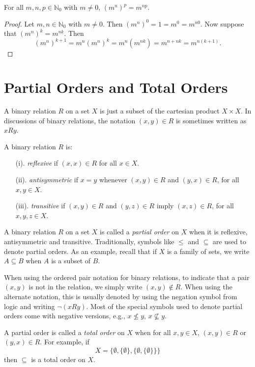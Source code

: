 \begin{theorem}
For all $m,n,p\in\mathbb{N}_0$ with $m\neq0$,
$(m^n)^p=m^{np}$.
\end{theorem}
\begin{proof}
Let $m,n\in\mathbb{N}_0$ with $m\neq0$.  Then
$(m^n)^0=1=m^0=m^{n0}$.  Now suppose that $(m^n)^k=m^{nk}$.
Then 
\[
(m^n)^{k+1}=m^n(m^n)^k=m^n(m^{nk})=m^{n+nk}=m^{n(k+1)}.
\]
\end{proof}

\section{Partial Orders and Total Orders}\label{s:order}

A binary relation $R$ on a set $X$ is just a subset of
the cartesian product $X\times X$.  In discussions of
binary relations, the notation $(x,y)\in R$ is sometimes
written as $xRy$.

A binary relation $R$ is:

\begin{enumerate} 
\item[(i).] \textit{reflexive} if $(x,x)\in R$ for
all $x\in X$.
\item[(ii).] \textit{antisymmetric} if $x=y$ whenever $(x,y)\in R$ and $(y,x)\in R$, for all $x,y\in X$.
\item[(iii).] \textit{transitive} if $(x,y)\in R$ and $(y,z)\in R$
imply $(x,z)\in R$, for all $x,y,z\in X$.
\end{enumerate}

A binary relation $R$ on a set $X$ is called a \textit{partial order} on
$X$ when it is reflexive, antisymmetric and transitive.
Traditionally, symbols like $\le$ and $\subseteq$ are used to denote
partial orders.  As an example, recall that if $X$ is a family of sets, 
we write $A\subseteq B$ when $A$ is a subset of $B$.  

When using the ordered pair notation for binary relations,
to indicate that a pair $(x,y)$ is not in the relation,
we simply write $(x,y)\notin R$. When using the alternate
notation, this is usually denoted by using the negation
symbol from logic and writing $\lnot (xRy)$.  Most of the
special symbols used to denote partial orders 
come with negative versions, e.g., $x\not\le y$, $x\nsubseteq y$.

A partial order is called a \textit{total order} on $X$ when for
all $x,y\in X$, $(x,y)\in R$ or $(y,x)\in R$.  For example,
if 
\[
X=\{\emptyset,\{\emptyset\},\{\emptyset,\{\emptyset\}\}\}
\]
then $\subseteq$ is a total order on $X$.

